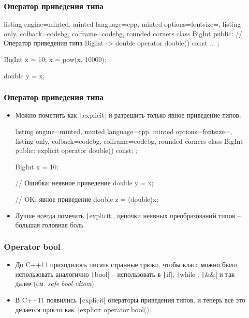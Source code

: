 \documentclass[10pt]{beamer}
\begin{document}
\begin{frame}[fragile]
\frametitle{Оператор приведения типа}
\begin{itemize}
\begin{tcblisting}{listing engine=minted, minted language=cpp, minted options={fontsize=\scriptsize}, listing only, colback=codebg, colframe=codebg, rounded corners}
class BigInt {
public:
  // Оператор приведения типа BigInt -> double
  operator double() const {
    ...
  }
};

BigInt x = 10;
x = pow(x, 10000);

double y = x;
\end{tcblisting}
\end{itemize}
\end{frame}

\begin{frame}[fragile]
\frametitle{Оператор приведения типа}
\begin{itemize}
\item Можно пометить как \texttt|explicit| и разрешить только явное приведение типов:
\begin{tcblisting}{listing engine=minted, minted language=cpp, minted options={fontsize=\scriptsize}, listing only, colback=codebg, colframe=codebg, rounded corners}
class BigInt {
public:
  explicit operator double() const;
};

BigInt x = 10;

// Ошибка: неявное приведение
double y = x;

// OK: явное приведение
double z = (double)x;
\end{tcblisting}
\pause
{}
\item Лучше всегда помечать \texttt|explicit|, цепочки неявных преобразований типов -- большая головная боль
\end{itemize}
\end{frame}

\begin{frame}[fragile]
\frametitle{Operator bool}
\begin{itemize}
\item До C++11 приходилось писать странные трюки, чтобы класс можно было использовать аналогично \texttt|bool| -- использовать в \texttt|if|, \texttt|while|, \texttt|&&| и так далее (см. \textit{safe bool idiom})
\pause
\item В C++11 появились \texttt|explicit| операторы приведения типов, и теперь всё это делается просто как \texttt|explicit operator bool()|
\end{itemize}
\end{frame}
\end{document}
